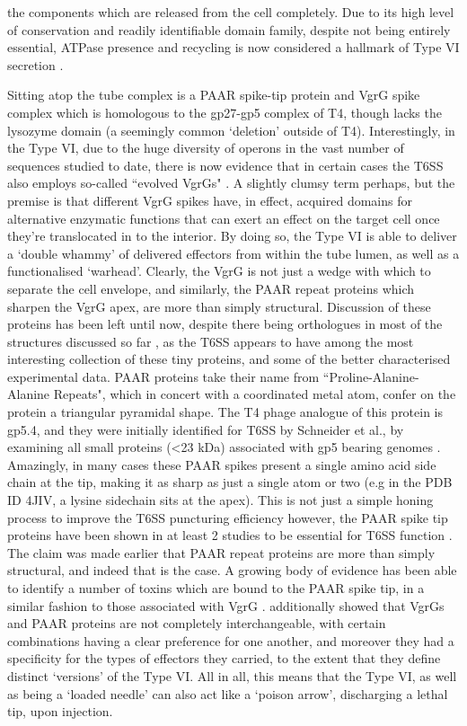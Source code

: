 the components which are released from the cell completely. Due to its high level of conservation and readily identifiable domain family, despite not being entirely essential, ATPase presence and recycling is now considered a hallmark of Type VI secretion \citep{Nguyen2018}.

Sitting atop the tube complex is a PAAR spike-tip protein and  VgrG spike complex which is homologous to the gp27-gp5 complex of T4, though lacks the lysozyme domain (a seemingly common `deletion' outside of T4). Interestingly, in the Type VI, due to the huge diversity of operons in the vast number of sequences studied to date, there is now evidence that in certain cases the T6SS also employs so-called ``evolved VgrGs" \citep{Pukatzki2007, Suarez2010, Hood2010, Cascales2012}. A slightly clumsy term perhaps, but the premise is that different VgrG spikes have, in effect, acquired domains for alternative enzymatic functions that can exert an effect on the target cell once they're translocated in to the interior. By doing so, the Type VI is able to deliver a `double whammy' of delivered effectors from within the tube lumen, as well as a functionalised `warhead'. Clearly, the VgrG is not just a wedge with which to separate the cell envelope, and similarly, the  PAAR repeat proteins which sharpen the VgrG apex, are more than simply structural. Discussion of these proteins has been left until now, despite there being orthologues in most of the structures discussed so far \citep{Sarris2014}, as the T6SS appears to have among the most interesting collection of these tiny proteins, and some of the better characterised experimental data. PAAR proteins take their name from ``Proline-Alanine-Alanine Repeats", which in concert with a coordinated metal atom, confer on the protein a triangular pyramidal shape. The T4 phage analogue of this protein is gp5.4, and they were initially identified for T6SS by Schneider et al., by examining all small proteins (\textless 23 kDa) associated with gp5 bearing genomes \citep{Shneider2013}. Amazingly, in many cases these PAAR spikes present a single amino acid side chain at the tip, making it as sharp as just a single atom or two (e.g in the PDB ID 4JIV, a lysine sidechain sits at the apex). This is not just a simple honing process to improve the T6SS puncturing efficiency however, the PAAR spike tip proteins have been shown in at least 2 studies to be essential for T6SS function \citep{Shneider2013, Cianfanelli2016}. The claim was made earlier that PAAR repeat proteins are more than simply structural, and indeed that is the case. A growing body of evidence has been able to identify a number of toxins which are bound to the PAAR spike tip, in a similar fashion to those associated with VgrG \citep{Hachani2014, Ma2017}. \cite{Cianfanelli2016} additionally showed that VgrGs and PAAR proteins are not completely interchangeable, with certain combinations having a clear preference for one another, and moreover they had a specificity for the types of effectors they carried, to the extent that they define distinct `versions' of the Type VI. All in all, this means that the Type VI, as well as being a `loaded needle' can also act like a `poison arrow', discharging a lethal tip, upon injection.


